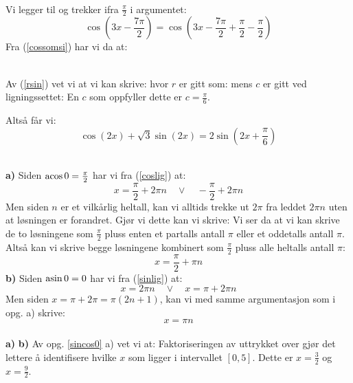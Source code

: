 \\
Vi legger til og trekker ifra $ \frac{\pi}{2} $ i argumentet:
\[ \cos\left(3x-\frac{7\pi}{2}\right) = \cos\left(3x-\frac{7\pi}{2}+\frac{\pi}{2}-\frac{\pi}{2}\right) \]
Fra (\ref{cossomsi}) har vi da at:

\\
Av (\ref{rsin}) vet vi at vi kan skrive:
hvor $ r $ er gitt som:
mens $ c $ er gitt ved ligningssettet: 
En $ c $ som oppfyller dette er $ c = \frac{\pi}{6} $.

Altså får vi:
\[ \cos( 2x) + \sqrt 3\sin (2x) =2 \sin\left(2x+\frac{\pi}{6}\right) \]

\\
\textbf{a)} Siden $ \operatorname{acos} 0 = \frac{\pi}{2} $ har vi fra (\ref{coslig}) at:
\[ x = \frac{\pi}{2}+2\pi n\quad \vee \quad -\frac{\pi}{2}+2\pi n \]
Men siden $ n $ er et vilkårlig heltall, kan vi alltids trekke ut $ 2\pi $ fra leddet $ 2\pi n $ uten at løsningen er forandret. Gjør vi dette kan vi skrive:
Vi ser da at vi kan skrive de to løsningene som $ \frac{\pi}{2} $ pluss enten et partalls antall $ \pi $ eller et oddetalls antall $ \pi $. Altså  kan vi skrive begge løsningene kombinert som $ \frac{\pi}{2} $ pluss alle heltalls antall $ \pi $:
\[ x = \frac{\pi}{2}+\pi n \]
\textbf{b)} Siden $ \operatorname{asin} 0 = 0 $ har vi fra (\ref{sinlig}) at:
\[ x = 2\pi n \quad\vee\quad x=\pi +2\pi n \]
Men siden $ x=\pi + 2\pi=\pi(2n+1) $, kan vi med samme argumentasjon som i opg. a) skrive:
\[ x = \pi n \]
\\
\textbf{a)} 
\textbf{b)} Av opg. \ref{sincos0} a) vet vi at:
Faktoriseringen av uttrykket over gjør det lettere å identifisere hvilke $ x $ som ligger i intervallet $ [0, 5] $. Dette er $ x=\frac{3}{2} $ og $ x = \frac{9}{2} $. \vsk

